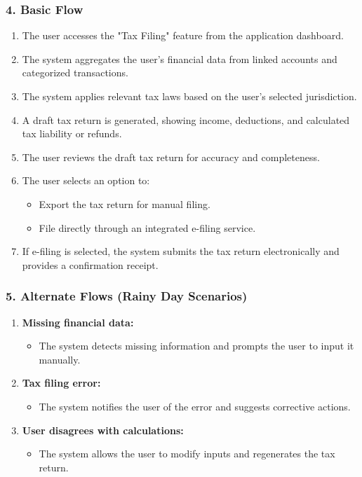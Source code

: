 \subsubsection*{4. Basic Flow }
\begin{enumerate}
    \item The user accesses the "Tax Filing" feature from the application dashboard.
    \item The system aggregates the user’s financial data from linked accounts and categorized transactions.
    \item The system applies relevant tax laws based on the user's selected jurisdiction.
    \item A draft tax return is generated, showing income, deductions, and calculated tax liability or refunds.
    \item The user reviews the draft tax return for accuracy and completeness.
    \item The user selects an option to:
    \begin{itemize}
        \item Export the tax return for manual filing.
        \item File directly through an integrated e-filing service.
    \end{itemize}
    \item If e-filing is selected, the system submits the tax return electronically and provides a confirmation receipt.
\end{enumerate}

\subsubsection*{5. Alternate Flows (Rainy Day Scenarios)}
\begin{enumerate}[label=5.\arabic*]
    \item \textbf{Missing financial data:}
    \begin{itemize}
        \item The system detects missing information and prompts the user to input it manually.
    \end{itemize}
    \item \textbf{Tax filing error:}
    \begin{itemize}
        \item The system notifies the user of the error and suggests corrective actions.
    \end{itemize}
    \item \textbf{User disagrees with calculations:}
    \begin{itemize}
        \item The system allows the user to modify inputs and regenerates the tax return.
    \end{itemize}
\end{enumerate}

